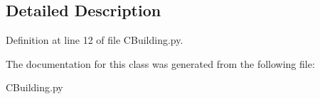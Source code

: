\subsection{Detailed Description}


Definition at line 12 of file C\+Building.\+py.



The documentation for this class was generated from the following file\+:\begin{DoxyCompactItemize}
\item 
C\+Building.\+py\end{DoxyCompactItemize}
